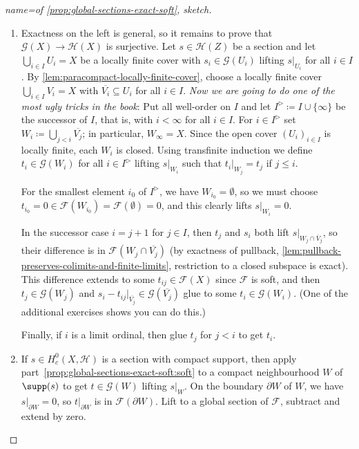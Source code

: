 \begin{proof}[name={of \cref{prop:global-sections-exact-soft}, sketch}]
\begin{enumerate}
\item
  Exactness on the left is general, so it remains to prove that \(\mathcal G(X)\to\mathcal H(X)\) is surjective.
  Let \(s\in\mathcal H(Z)\) be a section and let \(\bigcup_{i\in I}U_i=X\) be a locally finite cover with \(s_i\in\mathcal G(U_i)\) lifting \(s|_{U_i}\) for all \(i\in I\).
  By \cref{lem:paracompact-locally-finite-cover}, choose a locally finite cover \(\bigcup_{i\in I}V_i=X\) with \(\overline{V_i}\subseteq U_i\) for all \(i\in I\).
  \emph{Now we are going to do one of the most ugly tricks in the book}:
  Put all well-order on \(I\) and let \(I^\triangleright\coloneq I\cup\{\infty\}\) be the successor of \(I\), that is, with \(i<\infty\) for all \(i\in I\).
  For \(i\in I^\triangleright\) set \(W_i\coloneq\bigcup_{j<i}\overline{V_j}\); in particular, \(W_\infty=X\).
  Since the open cover \((U_i)_{i\in I}\) is locally finite, each \(W_i\) is closed.
  Using transfinite induction we define \(t_i\in\mathcal G(W_i)\) for all \(i\in I^\triangleright\) lifting \(s|_{W_i}\) such that \(t_i|_{W_j}=t_j\) if \(j\leq i\).

  For the smallest element \(i_0\) of \(I^\triangleright\), we have \(W_{i_0}=\emptyset\), so we must choose \(t_{i_0}=0\in\mathcal F(W_{i_0})=\mathcal F(\emptyset)=0\), and this clearly lifts \(s|_{W_i}=0\).

  In the successor case \(i=j+1\) for \(j\in I\), then \(t_j\) and \(s_i\) both lift \(s|_{W_j\cap\overline{V}_j}\), so their difference is in \(\mathcal F(W_j\cap\overline{V_j})\) (by exactness of pullback, \cref{lem:pullback-preserves-colimits-and-finite-limits}, restriction to a closed subspace is exact).
  This difference extends to some \(t_{ij}\in\mathcal F(X)\) since \(\mathcal F\) is soft, and then \(t_j\in\mathcal G(W_j)\) and \(s_i-t_{ij}|_{\overline{V_j}}\in\mathcal G(\overline{V_j})\) glue to some \(t_i\in\mathcal G(W_i)\).
  (One of the additional exercises shows you can do this.)

  Finally, if \(i\) is a limit ordinal, then glue \(t_j\) for \(j<i\) to get \(t_i\).
\item
  If \(s\in H^0_c(X,\mathcal H)\) is a section with compact support, then apply part~\cref{prop:global-sections-exact-soft:soft} to a compact neighbourhood \(W\) of \(\supp(s)\) to get \(t\in\mathcal G(W)\) lifting \(s|_W\).
  On the boundary \(\partial W\) of \(W\), we have \(s|_{\partial W}=0\), so \(t|_{\partial W}\) is in \(\mathcal F(\partial W)\).
  Lift to a global section of \(\mathcal F\), subtract and extend by zero.
  \qedhere
\end{enumerate}
\end{proof}


